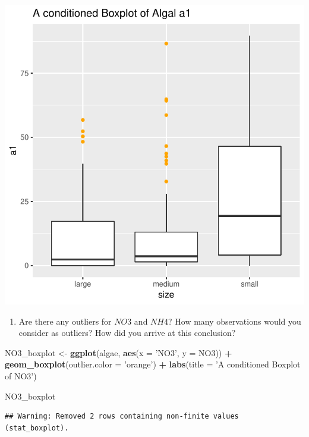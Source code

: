 \documentclass[]{article}
\newenvironment{Shaded}{\begin{snugshade}}{\end{snugshade}}
\newcommand{\KeywordTok}[1]{\textcolor[rgb]{0.13,0.29,0.53}{\textbf{#1}}}
\newcommand{\DataTypeTok}[1]{\textcolor[rgb]{0.13,0.29,0.53}{#1}}
\newcommand{\StringTok}[1]{\textcolor[rgb]{0.31,0.60,0.02}{#1}}
\newcommand{\OperatorTok}[1]{\textcolor[rgb]{0.81,0.36,0.00}{\textbf{#1}}}
\newcommand{\NormalTok}[1]{#1}
\providecommand{\tightlist}{%
  \setlength{\itemsep}{0pt}\setlength{\parskip}{0pt}}
\begin{document}
\begin{center}\includegraphics{homework1-handout_files/figure-latex/boxplot-1} \end{center}

\begin{enumerate}
\tightlist
\item
  Are there any outliers for \(NO3\) and \(NH4\)? How many observations
  would you consider as outliers? How did you arrive at this conclusion?
\end{enumerate}

\begin{Shaded}
\begin{Highlighting}[]
\NormalTok{NO3_boxplot <-}\StringTok{ }\KeywordTok{ggplot}\NormalTok{(algae, }\KeywordTok{aes}\NormalTok{(}\DataTypeTok{x =} \StringTok{'NO3'}\NormalTok{, }\DataTypeTok{y =}\NormalTok{ NO3)) }\OperatorTok{+}\StringTok{ }
\StringTok{  }\KeywordTok{geom_boxplot}\NormalTok{(}\DataTypeTok{outlier.color =} \StringTok{'orange'}\NormalTok{) }\OperatorTok{+}
\StringTok{  }\KeywordTok{labs}\NormalTok{(}\DataTypeTok{title =} \StringTok{'A conditioned Boxplot of NO3'}\NormalTok{)}

\NormalTok{NO3_boxplot }
\end{Highlighting}
\end{Shaded}

\begin{verbatim}
## Warning: Removed 2 rows containing non-finite values (stat_boxplot).
\end{verbatim}
\end{document}
